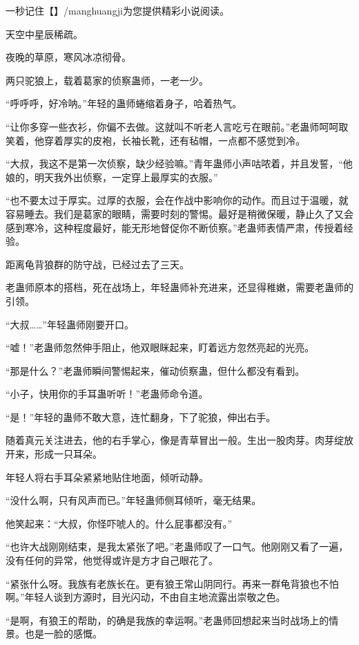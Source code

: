 
\begin{this_body}

一秒记住【】/manghuangji为您提供精彩小说阅读。

天空中星辰稀疏。

夜晚的草原，寒风冰凉彻骨。

两只驼狼上，载着葛家的侦察蛊师，一老一少。

“呼呼呼，好冷呐。”年轻的蛊师蜷缩着身子，哈着热气。

“让你多穿一些衣衫，你偏不去做。这就叫不听老人言吃亏在眼前。”老蛊师呵呵取笑着，他穿着厚实的皮袍，长袖长靴，还有毡帽，一点都不感觉到冷。

“大叔，我这不是第一次侦察，缺少经验嘛。”青年蛊师小声咕哝着，并且发誓，“他娘的，明天我外出侦察，一定穿上最厚实的衣服。”

“也不要太过于厚实。过厚的衣服，会在作战中影响你的动作。而且过于温暖，就容易睡去。我们是葛家的眼睛，需要时刻的警惕。最好是稍微保暖，静止久了又会感到寒冷，这种程度最好，能无形地督促你不断侦察。”老蛊师表情严肃，传授着经验。

距离龟背狼群的防守战，已经过去了三天。

老蛊师原本的搭档，死在战场上，年轻蛊师补充进来，还显得稚嫩，需要老蛊师的引领。

“大叔……”年轻蛊师刚要开口。

“嘘！”老蛊师忽然伸手阻止，他双眼眯起来，盯着远方忽然亮起的光亮。

“那是什么？”老蛊师瞬间警惕起来，催动侦察蛊，但什么都没有看到。

“小子，快用你的手耳蛊听听！”老蛊师命令道。

“是！”年轻的蛊师不敢大意，连忙翻身，下了驼狼，伸出右手。

随着真元关注进去，他的右手掌心，像是青草冒出一般。生出一股肉芽。肉芽绽放开来，形成一只耳朵。

年轻人将右手耳朵紧紧地贴住地面，倾听动静。

“没什么啊，只有风声而已。”年轻蛊师侧耳倾听，毫无结果。

他笑起来：“大叔，你怪吓唬人的。什么屁事都没有。”

“也许大战刚刚结束，是我太紧张了吧。”老蛊师叹了一口气。他刚刚又看了一遍，没有任何的异常，他觉得或许是方才自己眼花了。

“紧张什么呀。我族有老族长在。更有狼王常山阴同行。再来一群龟背狼也不怕啊。”年轻人谈到方源时，目光闪动，不由自主地流露出崇敬之色。

“是啊，有狼王的帮助，的确是我族的幸运啊。”老蛊师回想起来当时战场上的情景。也是一脸的感慨。


\end{this_body}
